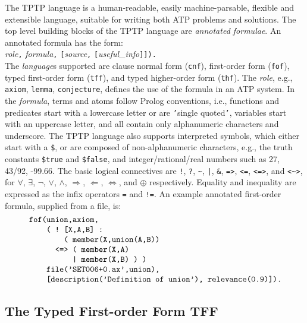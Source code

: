 \documentclass{easychair}
\begin{document}
The TPTP language is a human-readable, easily machine-parsable, flexible and
extensible language, suitable for writing both ATP problems and solutions.
The top level building blocks of the TPTP language are {\em annotated
formulae}.
An annotated formula has the form:\\
{\em role}{\tt ,}
{\em formula}{\tt ,}
{\tt [}{\em source}{\tt ,}
{\tt [}{\em useful\_info}{\tt ]]).}\\
The {\em language}s supported are clause normal form ({\tt cnf}),
first-order form ({\tt fof}), typed first-order form ({\tt tff}), and
typed higher-order form ({\tt thf}).
The {\em role}, e.g., {\tt axiom}, {\tt lemma}, {\tt conjecture},
defines the use of the formula in an ATP system.
In the {\em formula}, terms and atoms follow Prolog conventions, i.e.,
functions and predicates start with a lowercase letter or are {\tt '}single
quoted{\tt '}, variables start with an uppercase letter, and all
contain only alphanumeric characters and underscore.
The TPTP language also supports interpreted symbols, which either start with a
{\tt \$}, or are composed of non-alphanumeric characters, e.g., the truth
constants {\tt \$true} and {\tt \$false}, and integer/rational/real
numbers such as 27, 43/92, -99.66.
The basic logical connectives are
{\tt !}, {\tt ?}, {\tt \verb|~|}, {\tt |}, {\tt \&}, {\tt =>}, {\tt <=},
{\tt <=>}, and {\tt <\verb|~|>},
for
$\forall$, $\exists$, $\neg$, $\vee$, $\wedge$, $\Rightarrow$, $\Leftarrow$,
$\Leftrightarrow$, and $\oplus$ respectively.
Equality and inequality are expressed as the infix operators {\tt =} and
{\tt !=}.
An example annotated first-order formula, supplied from a file, is:
\[
\begin{minipage}{\textwidth}
\begin{verbatim}
    fof(union,axiom,
        ( ! [X,A,B] :
            ( member(X,union(A,B))
          <=> ( member(X,A)
              | member(X,B) ) )
        file('SET006+0.ax',union),
        [description('Definition of union'), relevance(0.9)]).
\end{verbatim}
\end{minipage}
\]

\subsection{The Typed First-order Form TFF}
\label{TFF}
\end{document}
